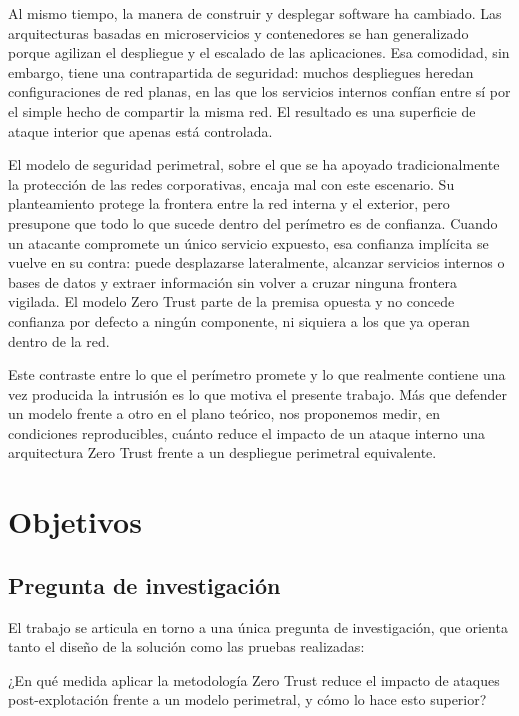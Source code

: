 \documentclass[11pt,spanish,listoffigures,listoftables]{tfgetsinf}
\begin{document}
    Al mismo tiempo, la manera de construir y desplegar software ha cambiado. Las arquitecturas basadas en microservicios y contenedores se han generalizado porque agilizan el despliegue y el escalado de las aplicaciones. Esa comodidad, sin embargo, tiene una contrapartida de seguridad: muchos despliegues heredan configuraciones de red planas, en las que los servicios internos confían entre sí por el simple hecho de compartir la misma red. El resultado es una superficie de ataque interior que apenas está controlada.
    
    El modelo de seguridad perimetral, sobre el que se ha apoyado tradicionalmente la protección de las redes corporativas, encaja mal con este escenario. Su planteamiento protege la frontera entre la red interna y el exterior, pero presupone que todo lo que sucede dentro del perímetro es de confianza. Cuando un atacante compromete un único servicio expuesto, esa confianza implícita se vuelve en su contra: puede desplazarse lateralmente, alcanzar servicios internos o bases de datos y extraer información sin volver a cruzar ninguna frontera vigilada. El modelo Zero Trust parte de la premisa opuesta y no concede confianza por defecto a ningún componente, ni siquiera a los que ya operan dentro de la red.
    
    Este contraste entre lo que el perímetro promete y lo que realmente contiene una vez producida la intrusión es lo que motiva el presente trabajo. Más que defender un modelo frente a otro en el plano teórico, nos proponemos medir, en condiciones reproducibles, cuánto reduce el impacto de un ataque interno una arquitectura Zero Trust frente a un despliegue perimetral equivalente.
    
    \section{Objetivos}
    \label{sec:1.2}
        \subsection{Pregunta de investigación}
        El trabajo se articula en torno a una única pregunta de investigación, que orienta tanto el diseño de la solución como las pruebas realizadas:

        \begin{tcolorbox}[
            enhanced,
            frame hidden,
            borderline west={3pt}{0pt}{gray!70!black},
            sharp corners
        ]
            ¿En qué medida aplicar la metodología Zero Trust reduce el impacto de ataques post-explotación frente a un modelo perimetral, y cómo lo hace esto superior?
        \end{tcolorbox}
\end{document}
